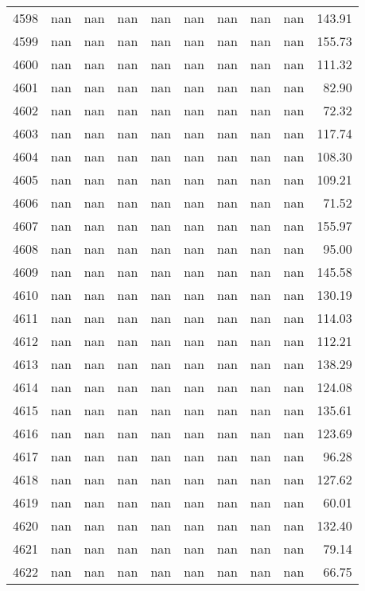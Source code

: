 \begin{tabular}{lrrrrrrrrr}
4598 & nan & nan & nan & nan & nan & nan & nan & nan & 143.91 \\
4599 & nan & nan & nan & nan & nan & nan & nan & nan & 155.73 \\
4600 & nan & nan & nan & nan & nan & nan & nan & nan & 111.32 \\
4601 & nan & nan & nan & nan & nan & nan & nan & nan & 82.90 \\
4602 & nan & nan & nan & nan & nan & nan & nan & nan & 72.32 \\
4603 & nan & nan & nan & nan & nan & nan & nan & nan & 117.74 \\
4604 & nan & nan & nan & nan & nan & nan & nan & nan & 108.30 \\
4605 & nan & nan & nan & nan & nan & nan & nan & nan & 109.21 \\
4606 & nan & nan & nan & nan & nan & nan & nan & nan & 71.52 \\
4607 & nan & nan & nan & nan & nan & nan & nan & nan & 155.97 \\
4608 & nan & nan & nan & nan & nan & nan & nan & nan & 95.00 \\
4609 & nan & nan & nan & nan & nan & nan & nan & nan & 145.58 \\
4610 & nan & nan & nan & nan & nan & nan & nan & nan & 130.19 \\
4611 & nan & nan & nan & nan & nan & nan & nan & nan & 114.03 \\
4612 & nan & nan & nan & nan & nan & nan & nan & nan & 112.21 \\
4613 & nan & nan & nan & nan & nan & nan & nan & nan & 138.29 \\
4614 & nan & nan & nan & nan & nan & nan & nan & nan & 124.08 \\
4615 & nan & nan & nan & nan & nan & nan & nan & nan & 135.61 \\
4616 & nan & nan & nan & nan & nan & nan & nan & nan & 123.69 \\
4617 & nan & nan & nan & nan & nan & nan & nan & nan & 96.28 \\
4618 & nan & nan & nan & nan & nan & nan & nan & nan & 127.62 \\
4619 & nan & nan & nan & nan & nan & nan & nan & nan & 60.01 \\
4620 & nan & nan & nan & nan & nan & nan & nan & nan & 132.40 \\
4621 & nan & nan & nan & nan & nan & nan & nan & nan & 79.14 \\
4622 & nan & nan & nan & nan & nan & nan & nan & nan & 66.75 \\

\end{tabular}
